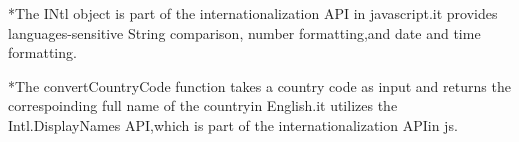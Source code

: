 *The INtl object is part of the internationalization API in javascript.it provides languages-sensitive String comparison,
number formatting,and date and time formatting.

*The convertCountryCode function takes a country code as input and returns the correspoinding full name of the countryin English.it utilizes the 
Intl.DisplayNames API,which is part of the internationalization APIin js.